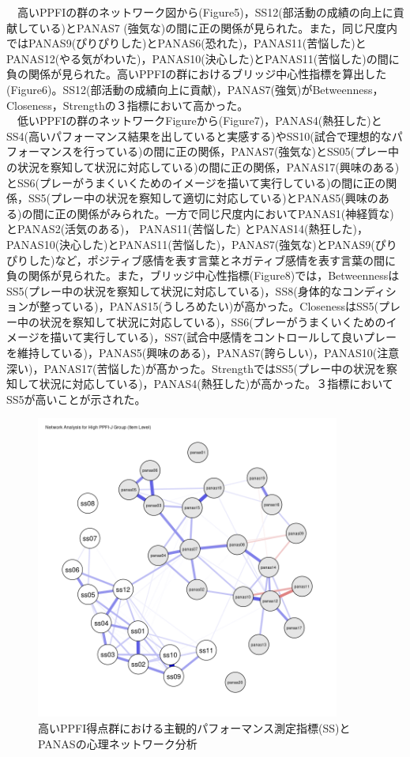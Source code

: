 \documentclass[12pt,a4paper,xelatex,ja=standard]{bxjsarticle}
\begin{document}
　高いPPFIの群のネットワーク図から(Figure5)，SS12(部活動の成績の向上に貢献している)とPANAS7
(強気な)の間に正の関係が見られた。また，同じ尺度内ではPANAS9(ぴりぴりした)とPANAS6(恐れた)，PANAS11(苦悩した)とPANAS12(やる気がわいた)，PANAS10(決心した)とPANAS11(苦悩した)の間に負の関係が見られた。高いPPFIの群におけるブリッジ中心性指標を算出した(Figure6)。SS12(部活動の成績向上に貢献)，PANAS7(強気)がBetweenness，Closeness，Strengthの３指標において高かった。\\
　低いPPFIの群のネットワークFigureから(Figure7)，PANAS4(熱狂した)とSS4(高いパフォーマンス結果を出していると実感する)やSS10(試合で理想的なパフォーマンスを行っている)の間に正の関係，PANAS7(強気な)とSS05(プレー中の状況を察知して状況に対応している)の間に正の関係，PANAS17(興味のある)とSS6(プレーがうまくいくためのイメージを描いて実行している)の間に正の関係，SS5(プレー中の状況を察知して適切に対応している)とPANAS5(興味のある)の間に正の関係がみられた。一方で同じ尺度内においてPANAS1(神経質な)とPANAS2(活気のある)，
PANAS11(苦悩した)
とPANAS14(熱狂した)，PANAS10(決心した)とPANAS11(苦悩した)，PANAS7(強気な)とPANAS9(ぴりぴりした)など，ポジティブ感情を表す言葉とネガティブ感情を表す言葉の間に負の関係が見られた。また，ブリッジ中心性指標(Figure8)では，BetweennessはSS5(プレー中の状況を察知して状況に対応している)，SS8(身体的なコンディションが整っている)，PANAS15(うしろめたい)が高かった。ClosenessはSS5(プレー中の状況を察知して状況に対応している)，SS6(プレーがうまくいくためのイメージを描いて実行している)，SS7(試合中感情をコントロールして良いプレーを維持している)，PANAS5(興味のある)，PANAS7(誇らしい)，PANAS10(注意深い)，PANAS17(苦悩した)が髙かった。StrengthではSS5(プレー中の状況を察知して状況に対応している)，PANAS4(熱狂した)が高かった。３指標においてSS5が高いことが示された。

\begin{figure}[H]
\centering
\includegraphics[clip,width = 10cm]{High_PPFI_J_Network.png}
\caption{高いPPFI得点群における主観的パフォーマンス測定指標(SS)とPANASの心理ネットワーク分析}
\end{figure}
\end{document}
